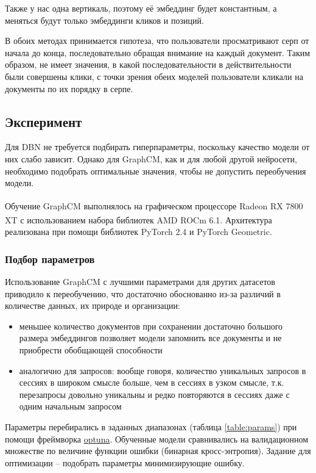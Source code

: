 \documentclass[diploma]{nanolab2015}
\begin{document}
Также у нас одна вертикаль, поэтому её эмбеддинг будет константным, а меняться будут только эмбеддинги кликов и позиций.

\bigbreak

В обоих методах принимается гипотеза, что пользователи просматривают серп от начала до конца, последовательно обращая внимание на каждый документ. Таким образом, не имеет значения, в какой последовательности в действительности были совершены клики, с точки зрения обеих моделей пользователи кликали на документы по их порядку в серпе.
\subsection{Эксперимент}
Для DBN не требуется подбирать гиперпараметры, поскольку качество модели от них слабо зависит. Однако для GraphCM, как и для любой другой нейросети, необходимо подобрать оптимальные значения, чтобы не допустить переобучения модели.

Обучение GraphCM выполнялось на графическом процессоре Radeon\textsuperscript{\texttrademark} RX 7800 XT с использованием набора библиотек AMD ROCm\textsuperscript{\texttrademark} 6.1. Архитектура реализована при помощи библиотек PyTorch 2.4 и PyTorch Geometric.
\subsubsection{Подбор параметров}
Использование GraphCM с лучшими параметрами для других датасетов приводило к переобучению, что достаточно обоснованно из-за различий в количестве данных, их природе и организации:
\begin{itemize}
    \item меньшее количество документов при сохранении достаточно большого размера эмбеддингов позволяет модели запомнить все документы и не приобрести обобщающей способности
    \item аналогично для запросов: вообще говоря, количество уникальных запросов в сессиях в широком смысле больше, чем в сессиях в узком смысле, т.к. перезапросы довольно уникальны и редко повторяются в сессиях даже с одним начальным запросом
\end{itemize}

Параметры перебирались в заданных диапазонах (таблица \ref{table:params}) при помощи фреймворка \href{https://optuna.org/}{optuna}. Обученные модели сравнивались на валидационном множестве по величине функции ошибки (бинарная кросс-энтропия). Задание для оптимизации -- подобрать параметры минимизирующие ошибку.
\end{document}
